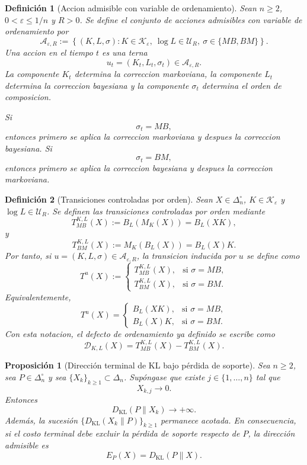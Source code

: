 \documentclass[12pt]{article}
\newtheorem{definicion}{Definición}[section]
\newtheorem{proposicion}{Proposición}[section]
\begin{document}
\begin{definicion}[Accion admisible con variable de ordenamiento]\label{def:accion_admisible_ordenamiento}
Sean \(n\ge 2\), \(0<\varepsilon\le 1/n\) y \(R>0\). Se define el conjunto de acciones admisibles con variable de ordenamiento por
\[
\mathcal A_{\varepsilon,R}
:=
\left\{
(K,L,\sigma):
K\in\mathcal K_\varepsilon,\ 
\log L\in\mathcal U_R,\ 
\sigma\in\{MB,BM\}
\right\}.
\]
Una accion en el tiempo \(t\) es una terna
\[
u_t=(K_t,L_t,\sigma_t)\in\mathcal A_{\varepsilon,R}.
\]
La componente \(K_t\) determina la correccion markoviana, la componente \(L_t\) determina la correccion bayesiana y la componente \(\sigma_t\) determina el orden de composicion.

Si
\[
\sigma_t=MB,
\]
entonces primero se aplica la correccion markoviana y despues la correccion bayesiana. Si
\[
\sigma_t=BM,
\]
entonces primero se aplica la correccion bayesiana y despues la correccion markoviana.
\end{definicion}

\begin{definicion}[Transiciones controladas por orden]\label{def:transiciones_controladas_orden}
Sean \(X\in\Delta_n^\circ\), \(K\in\mathcal K_\varepsilon\) y \(\log L\in\mathcal U_R\). Se definen las transiciones controladas por orden mediante
\[
T_{MB}^{K,L}(X)
:=
B_L(M_K(X))
=
B_L(XK),
\]
y
\[
T_{BM}^{K,L}(X)
:=
M_K(B_L(X))
=
B_L(X)K.
\]
Por tanto, si \(u=(K,L,\sigma)\in\mathcal A_{\varepsilon,R}\), la transicion inducida por \(u\) se define como
\[
T^u(X)
:=
\begin{cases}
T_{MB}^{K,L}(X), & \text{si } \sigma=MB,\\[2mm]
T_{BM}^{K,L}(X), & \text{si } \sigma=BM.
\end{cases}
\]
Equivalentemente,
\[
T^u(X)
=
\begin{cases}
B_L(XK), & \text{si } \sigma=MB,\\[2mm]
B_L(X)K, & \text{si } \sigma=BM.
\end{cases}
\]
Con esta notacion, el defecto de ordenamiento ya definido se escribe como
\[
\mathcal D_{K,L}(X)
=
T_{MB}^{K,L}(X)-T_{BM}^{K,L}(X).
\]
\end{definicion}

\begin{proposicion}[Dirección terminal de KL bajo pérdida de soporte]
\label{prop:direccion_terminal_KL}
Sea \(n\ge 2\), sea \(P\in\Delta_n^\circ\) y sea \(\{X_k\}_{k\ge1}\subset\Delta_n\). Supóngase que existe \(j\in\{1,\ldots,n\}\) tal que
\[
X_{k,j}\longrightarrow 0.
\]
Entonces
\[
D_{\mathrm{KL}}(P\|X_k)\longrightarrow +\infty.
\]
Además, la sucesión \(\{D_{\mathrm{KL}}(X_k\|P)\}_{k\ge1}\) permanece acotada. En consecuencia, si el costo terminal debe excluir la pérdida de soporte respecto de \(P\), la dirección admisible es
\[
E_P(X)=D_{\mathrm{KL}}(P\|X).
\]
\end{proposicion}
\end{document}
